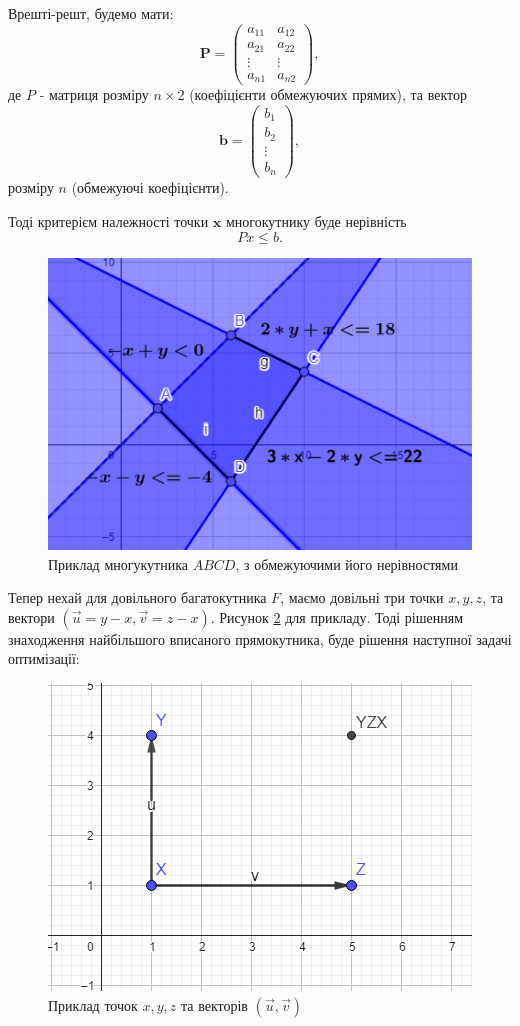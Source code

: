 \documentclass[a4paper,12pt]{article}
\begin{document}
	    Врешті-решт, будемо мати:
	\begin{equation*}
		\mathbf{P} = \begin{pmatrix}
			a_{11} & a_{12} \\
			a_{21} & a_{22} \\
			\vdots & \vdots \\
			a_{n1} & a_{n2}
		\end{pmatrix},
	\end{equation*}
	де $P$ - матриця розміру $n \times 2$ (коефіцієнти обмежуючих прямих), та вектор
	\begin{equation*}
		\mathbf{b} = \begin{pmatrix}
			b_1 \\
			b_2 \\
			\vdots \\
			b_n
		\end{pmatrix},
	\end{equation*}
	розміру $n$ (обмежуючі коефіцієнти).
	
	Тоді критерієм належності точки $\mathbf{x}$ многокутнику буде нерівність
	\begin{equation*}
		Px \leq b.
	\end{equation*} 
	
	\begin{figure}[htbp]
		\centering
		\includegraphics[width=0.6\linewidth]{images/example2}
		\caption{Приклад многукутника $ABCD$, з обмежуючими його нерівностями}
		\label{fig:im_example2}
	\end{figure}
	
	Тепер нехай для довільного багатокутника $F$, маємо довільні три точки $x, y, z$, та вектори $(\vec{u} = y - x, \vec{v} = z - x)$. Рисунок \ref{fig:im_example3} для прикладу.
	Тоді рішенням знаходження найбільшого вписаного прямокутника, буде рішення наступної задачі оптимізації: 
	
	\begin{figure}[htbp]
		\centering
		\includegraphics[width=0.6\linewidth]{images/example3}
		\caption{Приклад точок $x,y,z$ та векторів $(\vec{u},\vec{v}	)$}
		\label{fig:im_example3}
	\end{figure}
	
\end{document}
